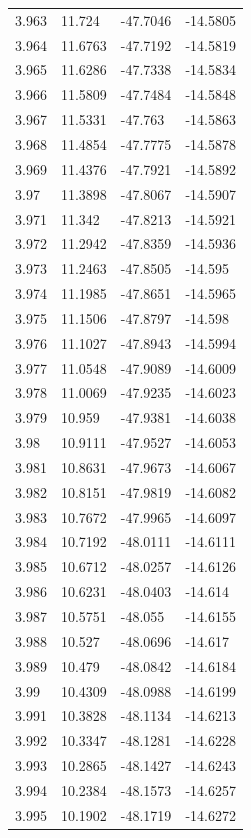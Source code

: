 \begin{tabular}{llll}
3.963 & 11.724 & -47.7046 & -14.5805 \\
3.964 & 11.6763 & -47.7192 & -14.5819 \\
3.965 & 11.6286 & -47.7338 & -14.5834 \\
3.966 & 11.5809 & -47.7484 & -14.5848 \\
3.967 & 11.5331 & -47.763 & -14.5863 \\
3.968 & 11.4854 & -47.7775 & -14.5878 \\
3.969 & 11.4376 & -47.7921 & -14.5892 \\
3.97 & 11.3898 & -47.8067 & -14.5907 \\
3.971 & 11.342 & -47.8213 & -14.5921 \\
3.972 & 11.2942 & -47.8359 & -14.5936 \\
3.973 & 11.2463 & -47.8505 & -14.595 \\
3.974 & 11.1985 & -47.8651 & -14.5965 \\
3.975 & 11.1506 & -47.8797 & -14.598 \\
3.976 & 11.1027 & -47.8943 & -14.5994 \\
3.977 & 11.0548 & -47.9089 & -14.6009 \\
3.978 & 11.0069 & -47.9235 & -14.6023 \\
3.979 & 10.959 & -47.9381 & -14.6038 \\
3.98 & 10.9111 & -47.9527 & -14.6053 \\
3.981 & 10.8631 & -47.9673 & -14.6067 \\
3.982 & 10.8151 & -47.9819 & -14.6082 \\
3.983 & 10.7672 & -47.9965 & -14.6097 \\
3.984 & 10.7192 & -48.0111 & -14.6111 \\
3.985 & 10.6712 & -48.0257 & -14.6126 \\
3.986 & 10.6231 & -48.0403 & -14.614 \\
3.987 & 10.5751 & -48.055 & -14.6155 \\
3.988 & 10.527 & -48.0696 & -14.617 \\
3.989 & 10.479 & -48.0842 & -14.6184 \\
3.99 & 10.4309 & -48.0988 & -14.6199 \\
3.991 & 10.3828 & -48.1134 & -14.6213 \\
3.992 & 10.3347 & -48.1281 & -14.6228 \\
3.993 & 10.2865 & -48.1427 & -14.6243 \\
3.994 & 10.2384 & -48.1573 & -14.6257 \\
3.995 & 10.1902 & -48.1719 & -14.6272 \\

\end{tabular}
